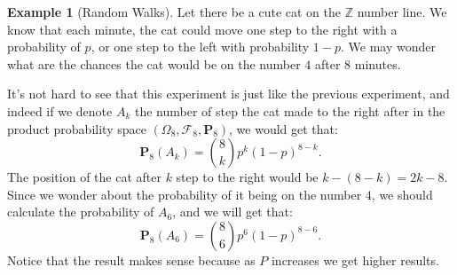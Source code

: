 \documentclass[11pt,a4paper]{article}
\theoremstyle{definition}
\newtheorem{example}{Example}[section]
\theoremstyle{plain}
\newcommand{\Z}{\mathbb{Z}}
\newcommand{\Prob}{\mathbf{P}}
\begin{document}
  \begin{example}[Random Walks]
    Let there be a cute cat on the $\Z$ number line. 
    We know that each minute, the cat could move one step to the right with
    a probability of $p$, or one step to the left with probability $1-p$.
    We may wonder what are the chances the cat would be on the number $4$
    after $8$ minutes.

    It's not hard to see that this experiment is just like the previous
    experiment, and indeed if we denote $A_k$ the number of step the cat
    made to the right after in the product probability space 
    $(\Omega_8, \mathcal F_8, \Prob_8)$, we would get that:
    \[
      \Prob_8(A_k) = \binom{8}{k} p^k (1-p)^{8-k}.
    \]
    The position of the cat after $k$ step to the right would be 
    $k - (8 - k) = 2k - 8$. 
    Since we wonder about the probability of it being on the number $4$,
    we should calculate the probability of $A_6$, and we will get that:
    \[
      \Prob_{8}(A_{6}) = {\binom{8}{6}} p^{6} (1-p)^{8-6}.
    \]
    Notice that the result makes sense because as $P$ increases we get higher
    results.
  \end{example}
\end{document}
